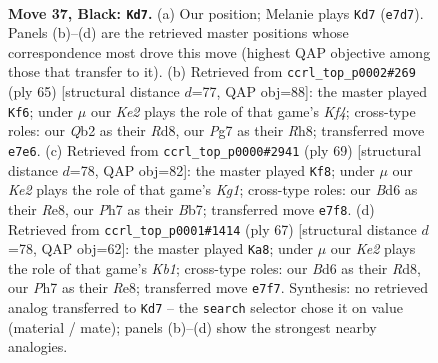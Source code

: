 \documentclass[11pt]{article}
\begin{document}
\clearpage

\begin{figure}[p]\centering
\begin{subfigure}{0.46\textwidth}\centering
\resizebox{\linewidth}{!}{%
\newchessgame
\chessboard[
  setfen={r6r/p3k1pp/3b4/n2p2Q1/p2P2PP/4P2K/1q1N4/2R5 b - - 7 37},
  showmover=false,
  pgfstyle=straightmove, color=movearrow, markmove={e7-d7}
]}
\caption{}
\end{subfigure}\hfill
\begin{subfigure}{0.46\textwidth}\centering
\resizebox{\linewidth}{!}{%
\newchessgame
\chessboard[
  setfen={3r3r/5p1p/2p5/2N1pk2/5b2/6RQ/PPP1KP1P/q7 b - - 15 33},
  showmover=false,
  pgfstyle=straightmove, color=movearrow, markmove={f5-f6}
]}
\caption{}
\end{subfigure}
\\[4pt]
\begin{subfigure}{0.46\textwidth}\centering
\resizebox{\linewidth}{!}{%
\newchessgame
\chessboard[
  setfen={4r1k1/1b6/p3p1Q1/1pq5/8/P1N2nP1/1PP1R3/2K5 b - - 6 35},
  showmover=false,
  pgfstyle=straightmove, color=movearrow, markmove={g8-f8}
]}
\caption{}
\end{subfigure}\hfill
\begin{subfigure}{0.46\textwidth}\centering
\resizebox{\linewidth}{!}{%
\newchessgame
\chessboard[
  setfen={1k1rr3/p7/1p2p3/1P2Q1pp/3P4/1q4P1/5PP1/2R1N1K1 b - - 1 34},
  showmover=false,
  pgfstyle=straightmove, color=movearrow, markmove={b8-a8}
]}
\caption{}
\end{subfigure}
\caption{\textbf{Move 37, Black: \texttt{Kd7}.} (a) Our position; Melanie plays \texttt{Kd7} (\texttt{e7d7}). Panels (b)--(d) are the retrieved master positions whose correspondence most drove this move (highest QAP objective among those that transfer to it). (b) Retrieved from \texttt{ccrl\_top\_p0002\#269} (ply 65) [structural distance $d$=77, QAP obj=88]: the master played \texttt{Kf6}; under $\mu$ our \emph{Ke2} plays the role of that game's \emph{Kf4}; cross-type roles: our \emph{Q}b2 as their \emph{R}d8, our \emph{P}g7 as their \emph{R}h8; transferred move \texttt{e7e6}. (c) Retrieved from \texttt{ccrl\_top\_p0000\#2941} (ply 69) [structural distance $d$=78, QAP obj=82]: the master played \texttt{Kf8}; under $\mu$ our \emph{Ke2} plays the role of that game's \emph{Kg1}; cross-type roles: our \emph{B}d6 as their \emph{R}e8, our \emph{P}h7 as their \emph{B}b7; transferred move \texttt{e7f8}. (d) Retrieved from \texttt{ccrl\_top\_p0001\#1414} (ply 67) [structural distance $d$=78, QAP obj=62]: the master played \texttt{Ka8}; under $\mu$ our \emph{Ke2} plays the role of that game's \emph{Kb1}; cross-type roles: our \emph{B}d6 as their \emph{R}d8, our \emph{P}h7 as their \emph{R}e8; transferred move \texttt{e7f7}. Synthesis: no retrieved analog transferred to \texttt{Kd7} -- the \texttt{search} selector chose it on value (material / mate); panels (b)--(d) show the strongest nearby analogies.}
\label{fig:thought-m73}
\end{figure}
\end{document}
